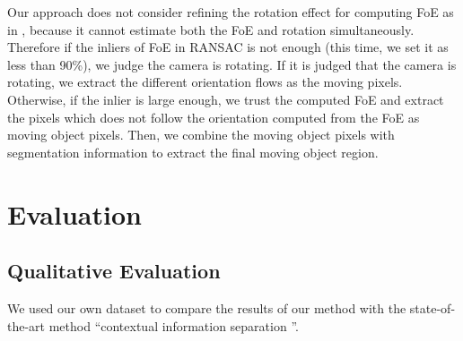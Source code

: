 \documentclass[10pt, twocolumn]{article}
\begin{document}
Our approach does not consider refining the rotation effect for computing FoE as in \cite{hu2000}, because it cannot estimate both the FoE and rotation simultaneously.
Therefore if the inliers of FoE in RANSAC is not enough (this time, we set it as less than 90\%), we judge the camera is rotating.
If it is judged that the camera is rotating, we extract the different orientation flows as the moving pixels.
Otherwise, if the inlier is large enough, we trust the computed FoE and extract the pixels which does not follow the orientation computed from the FoE as moving object pixels.
Then, we combine the moving object pixels with segmentation information to extract the final moving object region.


\section{Evaluation}

\subsection{Qualitative Evaluation}
We used our own dataset to compare the results of our method with the state-of-the-art method ``contextual information separation \cite{yang_loquercio_2019}''.
\end{document}

